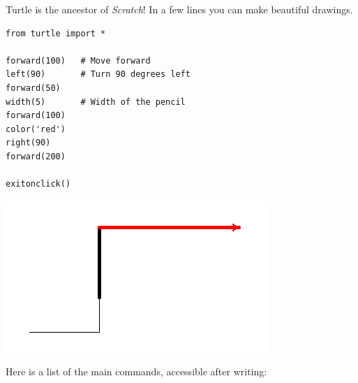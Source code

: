 \documentclass[11pt,class=report,crop=false]{standalone}
\begin{document}




\begin{cours}


Turtle is the ancestor of \emph{Scratch}! In a few lines you can make beautiful drawings.

\begin{lstlisting}
from turtle import *

forward(100)   # Move forward
left(90)       # Turn 90 degrees left
forward(50)
width(5)       # Width of the pencil
forward(100)
color('red')
right(90)
forward(200)

exitonclick()
\end{lstlisting}

\begin{center}
\includegraphics[scale=\myscale,scale=0.6]{screen-turtle-0}
\end{center}

Here is a list of the main commands, accessible after writing:


\end{cours}
\end{document}
